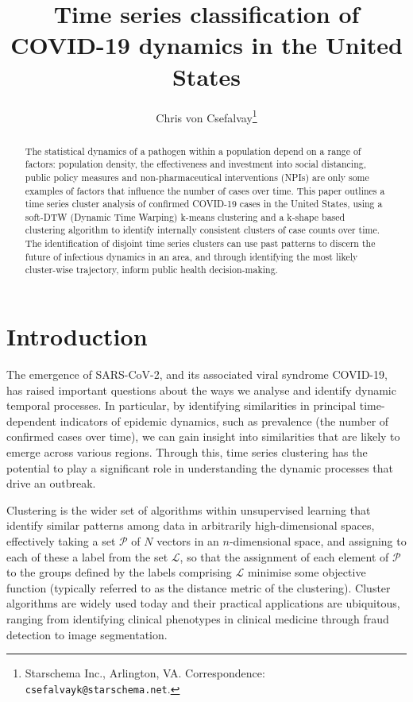 \documentclass{article}
\title{Time series classification of COVID-19 dynamics in the United States}
\author{Chris von Csefalvay\thanks{Starschema Inc., Arlington, VA. Correspondence: \texttt{csefalvayk@starschema.net}.}}
\begin{document}
\maketitle

\begin{abstract}
    The statistical dynamics of a pathogen within a population depend on a range of factors: population density, the effectiveness and investment into social distancing, public policy measures and non-pharmaceutical interventions (NPIs) are only some examples of factors that influence the number of cases over time. This paper outlines a time series cluster analysis of confirmed COVID-19 cases in the United States, using a soft-DTW (Dynamic Time Warping) k-means clustering and a k-shape based clustering algorithm to identify internally consistent clusters of case counts over time. The identification of disjoint time series clusters can use past patterns to discern the future of infectious dynamics in an area, and through identifying the most likely cluster-wise trajectory, inform public health decision-making.
\end{abstract}


\section{Introduction} %
\label{sec:introduction}

The emergence of SARS-CoV-2, and its associated viral syndrome COVID-19, has raised important questions about the ways we analyse and identify dynamic temporal processes. In particular, by identifying similarities in principal time-dependent indicators of epidemic dynamics, such as prevalence (the number of confirmed cases over time), we can gain insight into similarities that are likely to emerge across various regions. Through this, time series clustering has the potential to play a significant role in understanding the dynamic processes that drive an outbreak.

Clustering is the wider set of algorithms within unsupervised learning that identify similar patterns among data in arbitrarily high-dimensional spaces, effectively taking a set $\mathcal{P}$ of $N$ vectors in an $n$-dimensional space, and assigning to each of these a label from the set $\mathcal{L}$, so that the assignment of each element of $\mathcal{P}$ to the groups defined by the labels comprising $\mathcal{L}$ minimise some objective function (typically referred to as the distance metric of the clustering). Cluster algorithms are widely used today and their practical applications are ubiquitous, ranging from identifying clinical phenotypes in clinical medicine\cite{ahmad2014clinical,haldar2008cluster,lochner2005cluster,weatherall2009distinct,ye2014different} through fraud detection\cite{behera2015credit,liu2013healthcare,peng2006application,sabau2012survey,subudhi2017use} to image segmentation.\cite{chuang2006fuzzy,coleman1979image,jin2018accelerating,lafata2018data,pappas1989adaptive,wu1993optimal}
\end{document}
